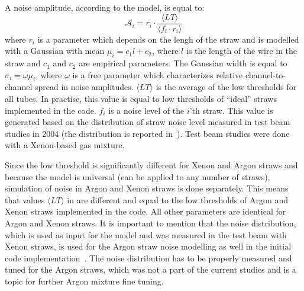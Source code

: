 

A noise amplitude, according to the model, is equal to:
\begin{equation}
 \mathcal A_{i} = r_{i} \cdot \dfrac{\langle LT \rangle}{\langle f_i \cdot r_i \rangle}
 \label{eq:ampl_noise}
\end{equation}
where $r_{i}$ is a parameter which depends on the lengh of the straw and is modelled with a Gaussian with mean $\mu_i = c_1 l + c_2$, 
where $l$ is the length of the wire in the straw and $c_1$ and $c_2$ are empirical parameters.
The Gaussian width is equal to $\sigma_i = \omega \mu_i$, where $\omega$ is a free parameter which characterizes
relative channel-to-channel spread in noise amplitudes.
$\langle LT \rangle$ is the average of the low thresholds for all tubes. In practise, this value is equal to low thresholds of ``ideal'' straws 
implemented in the code.
$f_{i}$ is a noise level of the $i$'th straw. This value is generated based on the distribution of straw noise level measured in test beam studies in 2004 
(the distribution is reported in~\cite{kittelmann_thesis}).
Test beam studies were done with a Xenon-based gas mixture. 

Since the low threshold is significantly different for Xenon and Argon straws and because the model is universal (can be applied to any number of straws), 
simulation of noise in Argon and Xenon straws is done separately. This means that values $\langle LT \rangle$ in  are 
different and equal to the low thresholds of Argon and Xenon straws implemented in the code. All other parameters are identical for Argon and Xenon straws.
It is important to mention that the noise distribution, which is used as input for the model and was measured in the test beam with Xenon straws,
is used for the Argon straw noise modelling as well in the initial code implementation~\cite{anatoli_private_communication}. 
The noise distribution has to be properly measured and tuned for the Argon straws, which
was not a part of the current studies and is a topic for further Argon mixture fine tuning.

